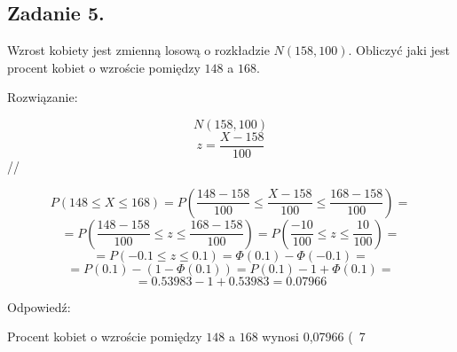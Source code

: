 \subsection{Zadanie 5.}
Wzrost kobiety jest zmienną losową o rozkładzie $N (158, 100)$. Obliczyć jaki
jest procent kobiet o wzroście pomiędzy $148$ a $168$.

Rozwiązanie:

$$ N(158, 100) $$
$$ z = \frac{X - 158}{100} $$ //

$$ P( 148 \le X \le 168 ) = P( \frac{148 - 158}{100} \le \frac{X - 158}{100} \le \frac{168 - 158}{100} ) = $$
$$ = P( \frac{148 - 158}{100} \le z \le \frac{168 - 158}{100} ) = P( \frac{-10}{100} \le z \le \frac{10}{100} ) = $$
$$ = P( -0.1 \le z \le 0.1 ) = \Phi(0.1) - \Phi(-0.1) = $$
$$ = P(0.1) - ( 1 - \Phi(0.1) ) =  P(0.1) -  1 + \Phi(0.1)  = $$
$$ = 0.53983 - 1 +  0.53983 = 0.07966 $$

Odpowiedź:

Procent kobiet o wzroście pomiędzy $148$ a $168$ wynosi 0,07966 (~7%

